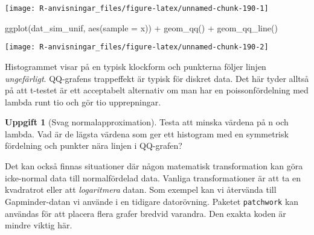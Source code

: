 \documentclass[
]{book}
\newenvironment{Shaded}{\begin{snugshade}}{\end{snugshade}}
\newcommand{\AttributeTok}[1]{\textcolor[rgb]{0.77,0.63,0.00}{#1}}
\newcommand{\FunctionTok}[1]{\textcolor[rgb]{0.00,0.00,0.00}{#1}}
\newcommand{\NormalTok}[1]{#1}
\newcommand{\SpecialCharTok}[1]{\textcolor[rgb]{0.00,0.00,0.00}{#1}}
\theoremstyle{definition}
\theoremstyle{definition}
\theoremstyle{definition}
\newtheorem{exercise}{Uppgift}[chapter]
\theoremstyle{definition}
\theoremstyle{remark}
\begin{document}
\begin{center}\texttt{[image: R-anvisningar\_files/figure-latex/unnamed-chunk-190-1]} \end{center}

\begin{Shaded}
\begin{Highlighting}[]
\FunctionTok{ggplot}\NormalTok{(dat\_sim\_unif, }\FunctionTok{aes}\NormalTok{(}\AttributeTok{sample =}\NormalTok{ x)) }\SpecialCharTok{+} \FunctionTok{geom\_qq}\NormalTok{() }\SpecialCharTok{+} \FunctionTok{geom\_qq\_line}\NormalTok{()}
\end{Highlighting}
\end{Shaded}

\begin{center}\texttt{[image: R-anvisningar\_files/figure-latex/unnamed-chunk-190-2]} \end{center}

Histogrammet visar på en typisk klockform och punkterna följer linjen \emph{ungefärligt}. QQ-grafens trappeffekt är typisk för diskret data. Det här tyder alltså på att t-testet är ett acceptabelt alternativ om man har en poissonfördelning med lambda runt tio och gör tio upprepningar.

\begin{exercise}[Svag normalapproximation]
Testa att minska värdena på n och lambda. Vad är de lägsta värdena som ger ett histogram med en symmetrisk fördelning och punkter nära linjen i QQ-grafen?
\end{exercise}

Det kan också finnas situationer där någon matematisk transformation kan göra icke-normal data till normalfördelad data. Vanliga transformationer är att ta en kvadratrot eller att \emph{logaritmera} datan. Som exempel kan vi återvända till Gapminder-datan vi använde i en tidigare datorövning. Paketet \texttt{patchwork} kan användas för att placera flera grafer bredvid varandra. Den exakta koden är mindre viktig här.
\end{document}
